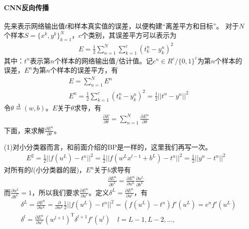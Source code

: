             \paragraph{CNN反向传播}先来表示网络输出值$t$和样本真实值的误差，以便构建“离差平方和目标”。
            对于$N$个样本$S=\{x^k,y^k\}_{k=1}^N$，$c$个类别，其误差平方可以表示为
            \begin{align*}
            E = \frac{1}{2}\sum_{n=1}^N\sum_{k=1}^c (t_k^n-y_k^n)^2
            \end{align*}
            其中：$t^n$表示第$n$个样本的网络输出值/估计值。记$e^n\in R^c/\{0,1\}^c$为第$n$个样本的误差，$E^n$为第$n$个样本的误差平方，有
            \begin{align*}
            & E = \sum_{n=1}^N E^n\\
            & E^n = \frac{1}{2}\sum_{k=1}^c (t_k^n - y_k^n)^2 = \frac{1}{2}||t^n - y^n||^2
            \end{align*}
            令$\theta \overset{\Delta}{=} (w,b)$。$E$关于$\theta$求导，有
            \begin{align*}
            \frac{\partial E}{\partial \theta} = \sum_{n=1}^N \frac{\partial E^n}{\partial \theta}
            \end{align*}
            下面，来求解$ \frac{\partial E^n}{\partial \theta}$。
            \par
            (1)对小分类器而言，和前面介绍的BP是一样的，这里我们再写一次。
            \begin{align*}
            E^2 = \frac{1}{2}||f(u^L) - t^n||^2 = \frac{1}{2}||f(w^Lx^{l-1}+b^L) - t^n||^2 = \frac{1}{2} ||y^n - t^n||^2
            \end{align*}
            对所有的$l$(小分类器的层)，$E^n$关于$b$求导有
            \begin{align*}
            \frac{\partial E^n}{\partial b^L} = \frac{\partial E^n}{\partial u^L} \frac{\partial u^L}{\partial b^L}
            \end{align*}
            而$\frac{\partial u^L}{\partial b^L} = 1$，所以我们要求$\frac{\partial E^n}{\partial u^l}$。定义$\delta^L = \frac{\partial E^n}{\partial u^l}$，有
            \begin{align*}
            & \delta^L = \frac{\partial E^n}{\partial u^L} = \frac{\partial }{\partial u^L}\frac{1}{2}||f(u^L) - t^n||^2 = (f(u^L )-t^n) f'(u^L) = e^n f'(u^L)\\
            & \delta ^l = \frac{\partial E^n}{\partial u^l} (w^{l+1})^\mathrm{T}\delta^{l+1}f'(u^l)\quad l=L-1,L-2,\dots,
            \end{align*}
